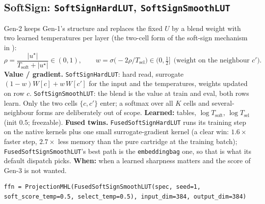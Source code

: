 \documentclass[11pt]{article}
\DeclareRobustCommand{\code}[1]{{\renewcommand{\_}{\textunderscore\allowbreak}\texttt{#1}}}
\begin{document}
\subsection{SoftSign: \code{SoftSignHardLUT}, \code{SoftSignSmoothLUT}}
\label{sec:softsign}
Gen-2 keeps Gen-1's structure and replaces the fixed $U$ by a blend weight with two learned temperatures
per layer (the two-cell form of the soft-sign mechanism in \citealp[\S2]{mechanisms}):
\[
  \rho=\frac{|u^\star|}{T_\text{soft}+|u^\star|}\in(0,1),\qquad
  w=\sigma\!\big(-2\rho/T_\text{sel}\big)\in(0,\tfrac12]\ \ \text{(weight on the neighbour $c'$)}.
\]
\textbf{Value / gradient.} \code{SoftSignHardLUT}: hard read, surrogate $(1-w)W[c]+w\,W[c']$ for the
input and the temperatures, weights updated on row $c$. \code{SoftSignSmoothLUT}: the blend is the value
at train and eval, both rows learn. Only the two cells $\{c,c'\}$ enter; a softmax over all $K$ cells and
several-neighbour forms are deliberately out of scope.
\textbf{Learned:} tables, $\log T_\text{soft}$, $\log T_\text{sel}$ (init $0.5$; freezable).
\textbf{Fused twins.} \code{FusedSoftSignHardLUT} runs its training step on the native kernels plus one
small surrogate-gradient kernel (a clear win: $1.6\times$ faster step, $2.7\times$ less memory than the pure
cartridge at the training batch); \code{FusedSoftSignSmoothLUT}'s best path is the \code{embedding\_bag}
one, so that is what its default dispatch picks. \textbf{When:} when a learned sharpness matters and
the score of Gen-3 is not wanted.
\begin{lstlisting}
ffn = ProjectionMHL(FusedSoftSignSmoothLUT(spec, seed=1, soft_score_temp=0.5, select_temp=0.5), input_dim=384, output_dim=384)
\end{lstlisting}
\end{document}
